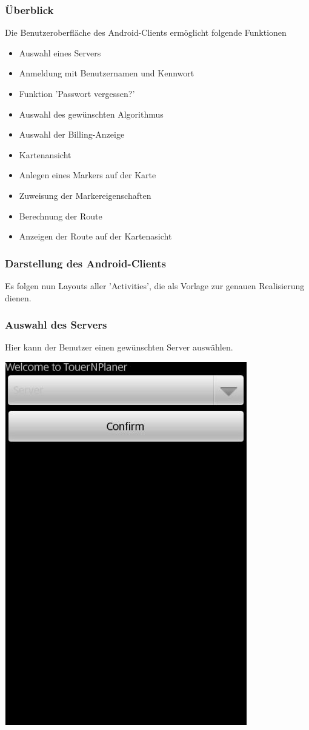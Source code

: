 \documentclass[a4paper,10pt,titlepage]{article}
\begin{document}
\subsubsection{Überblick}
Die Benutzeroberfläche des Android-Clients ermöglicht folgende Funktionen
\begin{itemize}
\item Auswahl eines Servers
\item Anmeldung mit Benutzernamen und Kennwort
\item Funktion 'Passwort vergessen?'
\item Auswahl des gewünschten Algorithmus
\item Auswahl der Billing-Anzeige 
\item Kartenansicht
\item Anlegen eines Markers auf der Karte
\item Zuweisung der Markereigenschaften
\item Berechnung der Route
\item Anzeigen der Route auf der Kartenasicht
\end{itemize}
\subsubsection{Darstellung des Android-Clients}
Es folgen nun Layouts aller 'Activities', die als Vorlage zur genauen Realisierung dienen.

\subsubsection{Auswahl des Servers}
Hier kann der Benutzer einen gewünschten Server auswählen.
\begin {center}
\includegraphics[scale=0.40]{media/android/server.jpg}
\end {center}
\end{document}
